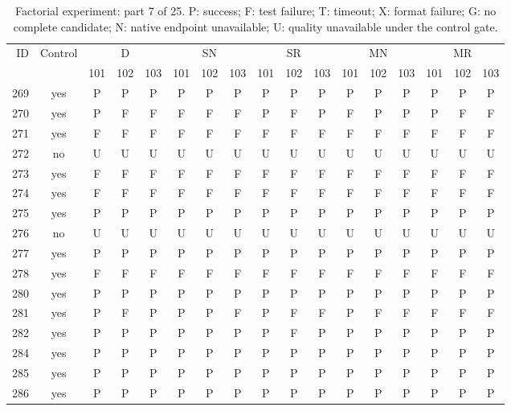 \begin{table}[p]\centering\footnotesize
\setlength{\tabcolsep}{3pt}
\caption{Factorial experiment: part 7 of 25. P: success; F: test failure; T: timeout; X: format failure; G: no complete candidate; N: native endpoint unavailable; U: quality unavailable under the control gate.}
\begin{tabular*}{\textwidth}{@{\extracolsep{\fill}}rcccccccccccccccc}\toprule
ID & Control & \multicolumn{3}{c}{D} & \multicolumn{3}{c}{SN} & \multicolumn{3}{c}{SR} & \multicolumn{3}{c}{MN} & \multicolumn{3}{c}{MR}\\
\cmidrule(lr){3-5}\cmidrule(lr){6-8}\cmidrule(lr){9-11}\cmidrule(lr){12-14}\cmidrule(lr){15-17}
 & & 101 & 102 & 103 & 101 & 102 & 103 & 101 & 102 & 103 & 101 & 102 & 103 & 101 & 102 & 103\\\midrule
269 & yes & P & P & P & P & P & P & P & P & P & P & P & P & P & P & P\\
270 & yes & P & F & F & F & F & F & P & F & P & F & P & P & P & F & F\\
271 & yes & F & F & F & F & F & F & F & F & F & F & F & F & F & F & F\\
272 & no & U & U & U & U & U & U & U & U & U & U & U & U & U & U & U\\
273 & yes & F & F & F & F & F & F & F & F & F & F & F & F & F & F & F\\
274 & yes & F & F & F & F & F & F & F & F & F & F & F & F & F & F & F\\
275 & yes & P & P & P & P & P & P & P & P & P & P & P & P & P & P & P\\
276 & no & U & U & U & U & U & U & U & U & U & U & U & U & U & U & U\\
277 & yes & P & P & P & P & P & P & P & P & P & P & P & P & P & P & P\\
278 & yes & F & F & F & F & F & F & F & F & F & F & F & F & F & F & F\\
280 & yes & P & P & P & P & P & P & P & P & P & P & P & P & P & P & P\\
281 & yes & P & F & P & P & P & F & P & F & F & P & F & F & F & F & F\\
282 & yes & P & P & P & P & P & P & P & F & P & P & P & P & P & P & P\\
284 & yes & P & P & P & P & P & P & P & P & P & P & P & P & P & P & P\\
285 & yes & P & P & P & P & P & P & P & P & P & P & P & P & P & P & P\\
286 & yes & P & P & P & P & P & P & P & P & P & P & P & P & P & P & P\\

\end{tabular*}
\end{table}
